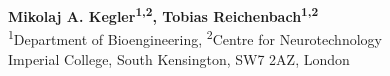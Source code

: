 \documentclass[a0,portrait]{a0poster}
\begin{document}
\huge \textbf{Mikolaj A. Kegler\textsuperscript{1,2}, Tobias Reichenbach\textsuperscript{1,2}}\\[0.4cm] %
\Large \textsuperscript{1}Department of Bioengineering, \textsuperscript{2}Centre for Neurotechnology\\Imperial College, South Kensington, SW7 2AZ, London %
%

\vspace{0.4cm} %

\end{document}
